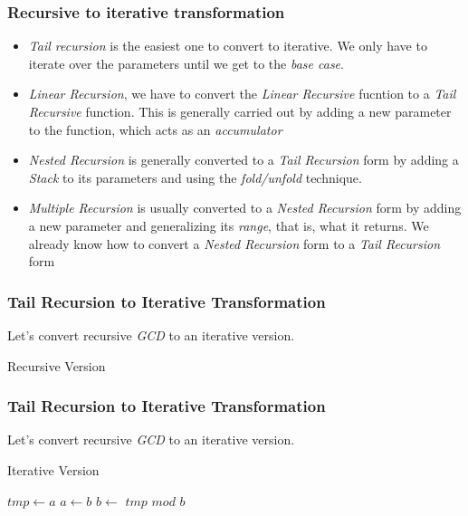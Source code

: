 \documentclass{beamer}
\begin{document}
\begin{frame}
	\frametitle{Recursive to iterative transformation}
	\begin{itemize}
		\item \textit{Tail recursion} is the easiest one to convert to iterative. We only have to iterate over the parameters until we get to the \textit{base case}.
		\item \textit{Linear Recursion}, we have to convert the \textit{Linear Recursive} fucntion to a \textit{Tail Recursive} function. This is generally carried out by adding a new parameter to the function, which acts as an \textit{accumulator}
		\item \textit{Nested Recursion} is generally converted to a \textit{Tail Recursion} form by adding a \textit{Stack} to its parameters and using the \textit{fold/unfold} technique.
		\item \textit{Multiple Recursion} is usually converted to a \textit{Nested Recursion} form by adding a new parameter and generalizing its \textit{range}, that is, what it returns. We already know how to convert a \textit{Nested Recursion} form to a \textit{Tail Recursion} form
	\end{itemize}
\end{frame}
\begin{frame}
	\frametitle{Tail Recursion to Iterative Transformation}
	Let's convert recursive \textit{GCD} to an iterative version.
	\begin{block}{Recursive Version}
				\begin{algorithmic}[1]
					\State{}
				\Else
					\State{}
				\EndIf
				\EndProcedure
			\end{algorithmic}
	\end{block}	
\end{frame}
\begin{frame}
	\frametitle{Tail Recursion to Iterative Transformation}
	Let's convert recursive \textit{GCD} to an iterative version.
	\begin{block}{Iterative Version}
				\begin{algorithmic}[1]
						\State $tmp \gets a$ 
						\State $a\gets b$
						\State $b \gets $ $tmp$ $mod$ $b$
					\EndWhile
					\State{}
				\EndProcedure
			\end{algorithmic}
	\end{block}	
\end{frame}
\end{document}
